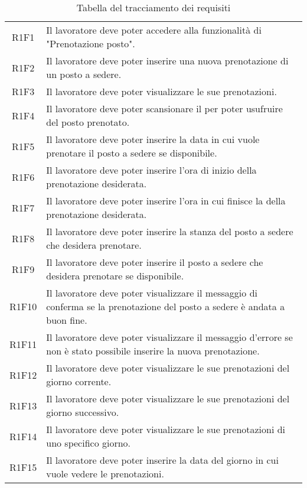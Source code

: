 \begin{table}[h]%
		\renewcommand{\arraystretch}{1.5}
	\centering
	\begin{tabularx}{\textwidth}{c X}
		\hline	
		\rowcolor{heavenly}
		\intest{Codice} &  \intest{Descrizione} \\	
		\hline			
		R1F1 & Il lavoratore deve poter accedere alla funzionalità di "Prenotazione posto".\\
		R1F2 & Il lavoratore deve poter inserire una nuova prenotazione di un posto a sedere.\\
		R1F3 & Il lavoratore deve poter visualizzare le sue prenotazioni.\\
		R1F4 & Il lavoratore deve poter scansionare il \g{QR code} per poter usufruire del posto prenotato.\\
		R1F5 & Il lavoratore deve poter inserire la data in cui vuole prenotare il posto a sedere se disponibile.\\
		R1F6 & Il lavoratore deve poter inserire l'ora di inizio della prenotazione desiderata.\\
		R1F7 & Il lavoratore deve poter inserire l'ora in cui finisce la della prenotazione desiderata.\\
		R1F8 & Il lavoratore deve poter inserire la stanza del posto a sedere che desidera prenotare.\\
		R1F9 & Il lavoratore deve poter inserire il posto a sedere che desidera prenotare se disponibile.\\
		R1F10 & Il lavoratore deve poter visualizzare il messaggio di conferma se la prenotazione del posto a sedere è andata a buon fine.\\
		R1F11 & Il lavoratore deve poter visualizzare il messaggio d'errore se non è stato possibile inserire la nuova prenotazione.\\
		R1F12 & Il lavoratore deve poter visualizzare le sue prenotazioni del giorno corrente.\\
		R1F13 & Il lavoratore deve poter visualizzare le sue prenotazioni del giorno successivo.\\
		R1F14 & Il lavoratore deve poter visualizzare le sue prenotazioni di uno specifico giorno.\\
		R1F15 & Il lavoratore deve poter inserire la data del giorno in cui vuole vedere le prenotazioni.\\
		\hline	
	\end{tabularx} \hbox{}
	\caption{Tabella del tracciamento dei requisiti}
\end{table}%


